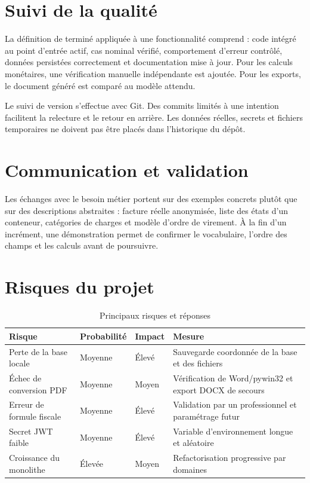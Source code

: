 \documentclass[12pt,a4paper,oneside]{report}
\begin{document}
\section{Suivi de la qualité}
La définition de terminé appliquée à une fonctionnalité comprend : code intégré au point d'entrée actif, cas nominal vérifié, comportement d'erreur contrôlé, données persistées correctement et documentation mise à jour. Pour les calculs monétaires, une vérification manuelle indépendante est ajoutée. Pour les exports, le document généré est comparé au modèle attendu.

Le suivi de version s'effectue avec Git. Des commits limités à une intention facilitent la relecture et le retour en arrière. Les données réelles, secrets et fichiers temporaires ne doivent pas être placés dans l'historique du dépôt.

\section{Communication et validation}
Les échanges avec le besoin métier portent sur des exemples concrets plutôt que sur des descriptions abstraites : facture réelle anonymisée, liste des états d'un conteneur, catégories de charges et modèle d'ordre de virement. À la fin d'un incrément, une démonstration permet de confirmer le vocabulaire, l'ordre des champs et les calculs avant de poursuivre.

\section{Risques du projet}
\begin{table}[H]\centering
\caption{Principaux risques et réponses}
\begin{tabularx}{\textwidth}{Y p{2.2cm}p{2.2cm}Y}
\toprule \textbf{Risque} & \textbf{Probabilité} & \textbf{Impact} & \textbf{Mesure}\\ \midrule
Perte de la base locale & Moyenne & Élevé & Sauvegarde coordonnée de la base et des fichiers\\
Échec de conversion PDF & Moyenne & Moyen & Vérification de Word/pywin32 et export DOCX de secours\\
Erreur de formule fiscale & Moyenne & Élevé & Validation par un professionnel et paramétrage futur\\
Secret JWT faible & Moyenne & Élevé & Variable d'environnement longue et aléatoire\\
Croissance du monolithe & Élevée & Moyen & Refactorisation progressive par domaines\\
\bottomrule
\end{tabularx}
\end{table}
\end{document}
